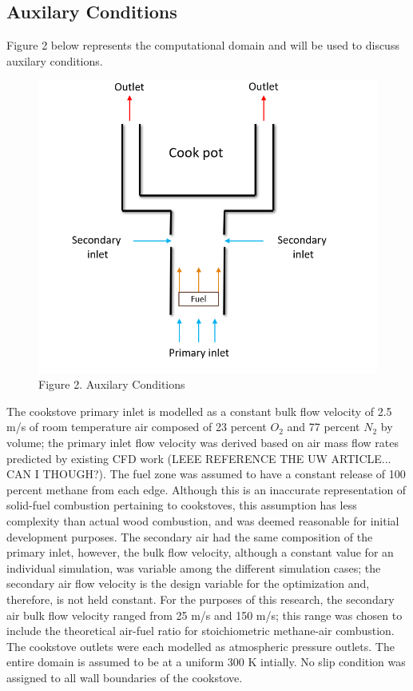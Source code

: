 \documentclass[3p,times,twocolumn]{elsarticle}
\begin{document}
\subsection{Auxilary Conditions}
Figure 2 below represents the computational domain and will be used to discuss auxilary conditions.

\begin{figure}{\linewidth}
	\includegraphics[width=\linewidth]{auxconditions}
	\centering
	\caption{Figure 2. Auxilary Conditions}
\end{figure}

The cookstove primary inlet is modelled as a constant bulk flow velocity of 2.5 m/s of room temperature air composed of 23 percent $O_{2}$ and 77 percent $N_{2}$ by volume; the primary inlet flow velocity was derived based on air mass flow rates predicted by existing CFD work (LEEE REFERENCE THE UW ARTICLE... CAN I THOUGH?). The fuel zone was assumed to have a constant release of 100 percent methane from each edge. Although this is an inaccurate representation of solid-fuel combustion pertaining to cookstoves, this assumption has less complexity than actual wood combustion, and was deemed reasonable for initial development purposes. The secondary air had the same composition of the primary inlet, however, the bulk flow velocity, although a constant value for an individual simulation, was variable among the different simulation cases; the secondary air flow velocity is the design variable for the optimization and, therefore, is not held constant. For the purposes of this research, the secondary air bulk flow velocity ranged from 25 m/s and 150 m/s; this range was chosen to include the theoretical air-fuel ratio for stoichiometric methane-air combustion. The cookstove outlets were each modelled as atmospheric pressure outlets. The entire domain is assumed to be at a uniform 300 K intially. No slip condition was assigned to all wall boundaries of the cookstove. 
\end{document}
